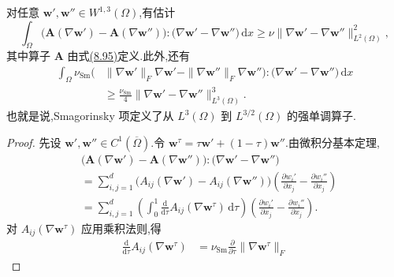 \begin{lemma}[非线性黏性算子的强单调性]
\label{lem:smagorinsky-strong-monotonicity}
对任意 $\bm{w}',\bm{w}''\in W^{1,3}(\Omega)$,有估计
\begin{equation}\label{eq:smagorinsky-operator-monotonicity}
 \int_\Omega
  \bigl(\bm{A}(\nabla\bm{w}')-\bm{A}(\nabla\bm{w}'')\bigr)
       :\bigl(\nabla\bm{w}'-\nabla\bm{w}''\bigr)\,\mathrm{d}x
 \ge \nu\|\nabla\bm{w}'-\nabla\bm{w}''\|_{L^2(\Omega)}^2,
\end{equation}
其中算子 $\bm{A}$ 由式\hyperref[eq:smagorinsky-nonlinear-viscous-operator]{(8.95)}定义.此外,还有
\begin{equation}\label{eq:smagorinsky-turbulent-strong-monotonicity}
\begin{aligned}
 \int_\Omega\nu_{\mathrm{Sm}}\bigl(&
       \|\nabla\bm{w}'\|_F\nabla\bm{w}'
       -\|\nabla\bm{w}''\|_F\nabla\bm{w}''\bigr)
       :\bigl(\nabla\bm{w}'-\nabla\bm{w}''\bigr)\,\mathrm{d}x\\
 &\ge \frac{\nu_{\mathrm{Sm}}}{4}
       \|\nabla\bm{w}'-\nabla\bm{w}''\|_{L^3(\Omega)}^3.
\end{aligned}
\end{equation}
也就是说,Smagorinsky 项定义了从 $L^3(\Omega)$ 到 $L^{3/2}(\Omega)$ 的强单调算子.
\begin{proof}
先设 $\bm{w}',\bm{w}''\in C^1(\overline{\Omega})$.令
$\bm{w}^{\tau}=\tau\bm{w}'+(1-\tau)\bm{w}''$.由微积分基本定理,
\begin{equation}\label{eq:smagorinsky-monotonicity-fundamental-theorem}
\begin{aligned}
 &\bigl(\bm{A}(\nabla\bm{w}')-\bm{A}(\nabla\bm{w}'')\bigr)
       :\bigl(\nabla\bm{w}'-\nabla\bm{w}''\bigr)\\
 &=\sum_{i,j=1}^{d}
    \bigl(A_{ij}(\nabla\bm{w}')-A_{ij}(\nabla\bm{w}'')\bigr)
    \left(\frac{\partial w_i'}{\partial x_j}
                 -\frac{\partial w_i''}{\partial x_j}\right)\\
 &=\sum_{i,j=1}^{d}
    \left(\int_0^1\frac{\mathrm{d}}{\mathrm{d}\tau}
             A_{ij}(\nabla\bm{w}^{\tau})\,\mathrm{d}\tau\right)
    \left(\frac{\partial w_i'}{\partial x_j}
                 -\frac{\partial w_i''}{\partial x_j}\right).
\end{aligned}
\end{equation}
对 $A_{ij}(\nabla\bm{w}^{\tau})$ 应用乘积法则,得
\[
\begin{aligned}
 \frac{\mathrm{d}}{\mathrm{d}\tau}A_{ij}(\nabla\bm{w}^{\tau})
 &=\nu_{\mathrm{Sm}}\frac{\partial}{\partial\tau}
             \|\nabla\bm{w}^{\tau}\|_F

\end{aligned}\]
\end{proof}
\end{lemma}
